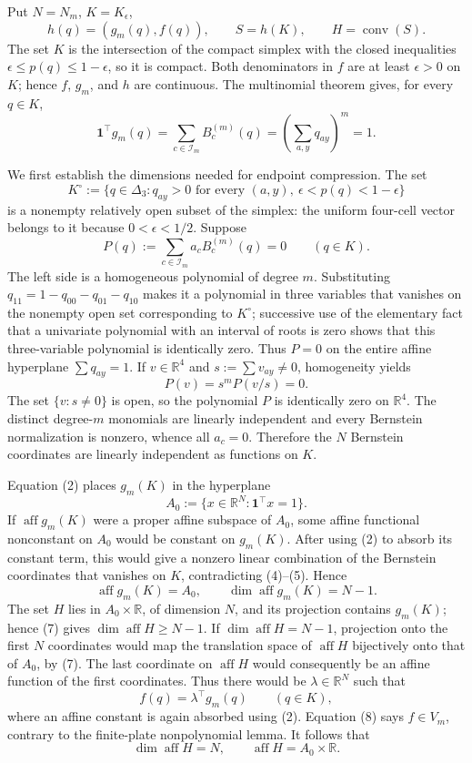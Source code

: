 Put \(N=N_m\), \(K=K_{\epsilon}\),
\[
 h(q)=(g_m(q),f(q)),\qquad S=h(K),\qquad H=\operatorname{conv}(S).
\tag{1}
\]
The set \(K\) is the intersection of the compact simplex with the closed inequalities \(\epsilon\leq p(q)\leq1-\epsilon\), so it is compact.  Both denominators in \(f\) are at least \(\epsilon>0\) on \(K\); hence \(f\), \(g_m\), and \(h\) are continuous.  The multinomial theorem gives, for every \(q\in K\),
\[
 \mathbf 1^{\top}g_m(q)=\sum_{c\in\mathcal I_m}B_c^{(m)}(q)
 =\left(\sum_{a,y}q_{ay}\right)^m=1.
\tag{2}
\]

We first establish the dimensions needed for endpoint compression.  The set
\[
 K^{\circ}:=\{q\in\Delta_3:q_{ay}>0\text{ for every }(a,y),\ 
 \epsilon<p(q)<1-\epsilon\}
\tag{3}
\]
is a nonempty relatively open subset of the simplex: the uniform four-cell vector belongs to it because \(0<\epsilon<1/2\).  Suppose
\[
 P(q):=\sum_{c\in\mathcal I_m}a_cB_c^{(m)}(q)=0\qquad(q\in K).
\tag{4}
\]
The left side is a homogeneous polynomial of degree \(m\).  Substituting \(q_{11}=1-q_{00}-q_{01}-q_{10}\) makes it a polynomial in three variables that vanishes on the nonempty open set corresponding to \(K^{\circ}\); successive use of the elementary fact that a univariate polynomial with an interval of roots is zero shows that this three-variable polynomial is identically zero.  Thus \(P=0\) on the entire affine hyperplane \(\sum q_{ay}=1\).  If \(v\in\mathbb R^4\) and \(s:=\sum v_{ay}\neq0\), homogeneity yields
\[
 P(v)=s^mP(v/s)=0.
\tag{5}
\]
The set \(\{v:s\neq0\}\) is open, so the polynomial \(P\) is identically zero on \(\mathbb R^4\).  The distinct degree-\(m\) monomials are linearly independent and every Bernstein normalization is nonzero, whence all \(a_c=0\).  Therefore the \(N\) Bernstein coordinates are linearly independent as functions on \(K\).

Equation (2) places \(g_m(K)\) in the hyperplane
\[
 A_0:=\{x\in\mathbb R^N:\mathbf 1^{\top}x=1\}.
\tag{6}
\]
If \(\operatorname{aff}g_m(K)\) were a proper affine subspace of \(A_0\), some affine functional nonconstant on \(A_0\) would be constant on \(g_m(K)\).  After using (2) to absorb its constant term, this would give a nonzero linear combination of the Bernstein coordinates that vanishes on \(K\), contradicting (4)--(5).  Hence
\[
 \operatorname{aff}g_m(K)=A_0,\qquad
 \dim\operatorname{aff}g_m(K)=N-1.
\tag{7}
\]
The set \(H\) lies in \(A_0\times\mathbb R\), of dimension \(N\), and its projection contains \(g_m(K)\); hence (7) gives \(\dim\operatorname{aff}H\geq N-1\).  If \(\dim\operatorname{aff}H=N-1\), projection onto the first \(N\) coordinates would map the translation space of \(\operatorname{aff}H\) bijectively onto that of \(A_0\), by (7).  The last coordinate on \(\operatorname{aff}H\) would consequently be an affine function of the first coordinates.  Thus there would be \(\lambda\in\mathbb R^N\) such that
\[
 f(q)=\lambda^{\top}g_m(q)\qquad(q\in K),
\tag{8}
\]
where an affine constant is again absorbed using (2).  Equation (8) says \(f\in V_m\), contrary to the finite-plate nonpolynomial lemma.  It follows that
\[
 \dim\operatorname{aff}H=N,\qquad
 \operatorname{aff}H=A_0\times\mathbb R.
\tag{9}
\]

